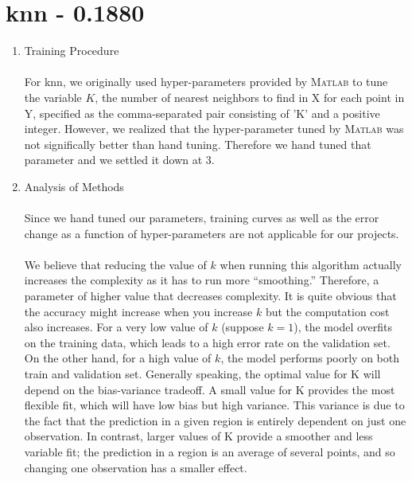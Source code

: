 \documentclass[english]{article}
\newcommand{\MATLAB}{\textsc{Matlab}\xspace}
\begin{document}
\section{knn - 0.1880}
\begin{enumerate}
\item Training Procedure\\\\
For knn, we originally used hyper-parameters provided by \MATLAB to tune the variable $K$, the number of nearest neighbors to find in X for each point in Y, specified as the comma-separated pair consisting of 'K' and a positive integer. However, we realized that the hyper-parameter tuned by \MATLAB was not significally better than hand tuning. Therefore we hand tuned that parameter and we settled it down at 3.\\
\item Analysis of Methods\\\\
Since we hand tuned our parameters, training curves as well as the error change as a function of hyper-parameters are not applicable for our projects.\\\\
We believe that reducing the value of $k$ when running this algorithm actually increases the complexity as it has to run more “smoothing.” Therefore, a parameter of higher value that decreases complexity. It is quite obvious that the accuracy might increase when you increase $k$ but the computation cost also increases. For a very low value of $k$ (suppose $k=1$), the model overfits on the training data, which leads to a high error rate on the validation set. On the other hand, for a high value of $k$, the model performs poorly on both train and validation set. Generally speaking, the optimal value for K will depend on the
bias-variance tradeoff. A small value for K provides the most flexible fit, which will have low bias but high variance. This variance is due to the fact that the prediction in a given region is entirely dependent on just one observation. In contrast, larger values of K provide a smoother and less variable fit; the prediction in a region is an average of several points, and so changing one observation has a smaller effect.
\end{enumerate}
\end{document}

